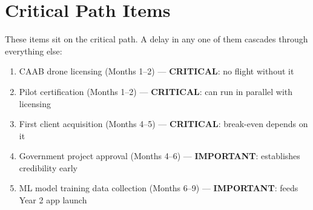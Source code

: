 \section{Critical Path Items}

\begin{importantbox}
    These items sit on the critical path. A delay in any one of them cascades through everything else:
    \begin{enumerate}
        \item CAAB drone licensing (Months 1--2) --- \textbf{CRITICAL}: no flight without it
        \item Pilot certification (Months 1--2) --- \textbf{CRITICAL}: can run in parallel with licensing
        \item First client acquisition (Months 4--5) --- \textbf{CRITICAL}: break-even depends on it
        \item Government project approval (Months 4--6) --- \textbf{IMPORTANT}: establishes credibility early
        \item ML model training data collection (Months 6--9) --- \textbf{IMPORTANT}: feeds Year 2 app launch
    \end{enumerate}
\end{importantbox}

